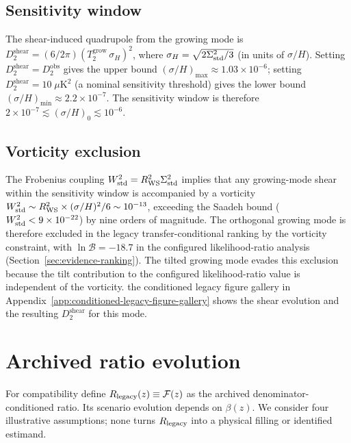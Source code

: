 \subsection{Sensitivity window}

The shear-induced quadrupole from the growing mode is
$D_2^{\mathrm{shear}} = (6/2\pi)(T_2^{\mathrm{grow}}\,
\sigma_H)^2$, where $\sigma_H = \sqrt{2\Sigma^2_{\mathrm{std}}/3}$ (in units of $\sigma/H$).
Setting $D_2^{\mathrm{shear}} = D_2^{\mathrm{obs}}$ gives the
upper bound $(\sigma/H)_{\max} \approx 1.03 \times 10^{-6}$;
setting $D_2^{\mathrm{shear}} = 10\;\mu\mathrm{K}^2$ (a
nominal sensitivity threshold) gives the lower bound
$(\sigma/H)_{\min} \approx 2.2 \times 10^{-7}$.  The sensitivity
window is therefore
$2 \times 10^{-7} \lesssim (\sigma/H)_0 \lesssim 10^{-6}$.

\subsection{Vorticity exclusion}

The Frobenius coupling $W^2_{\mathrm{std}} = R_{\mathrm{WS}}^2\Sigma^2_{\mathrm{std}}$
implies that any growing-mode shear within the sensitivity window
is accompanied by a vorticity
$W^2_{\mathrm{std}} \sim R_{\mathrm{WS}}^2 \times (\sigma/H)^2/6
\sim 10^{-13}$, exceeding the Saadeh bound
($W^2_{\mathrm{std}} < 9 \times 10^{-22}$) by nine orders of magnitude.
The orthogonal growing mode is therefore excluded in the legacy
transfer-conditional ranking by
the vorticity constraint, with $\ln\mathcal{B} = -18.7$ in the
configured likelihood-ratio analysis (Section~\ref{sec:evidence-ranking}).  The
tilted growing mode evades this exclusion because the tilt
contribution to the configured likelihood-ratio value is independent of the vorticity.
the conditioned legacy figure gallery in Appendix~\ref{app:conditioned-legacy-figure-gallery} shows the shear evolution and
the resulting $D_2^{\mathrm{shear}}$ for this mode.


\section{Archived ratio evolution}\label{sec:filling-z}

For compatibility define
$R_{\rm legacy}(z)\equiv\mathcal{F}(z)$ as the archived
denominator-conditioned ratio.  Its scenario evolution depends on
$\beta(z)$.  We consider four illustrative assumptions; none turns
$R_{\rm legacy}$ into a physical filling or identified estimand.

